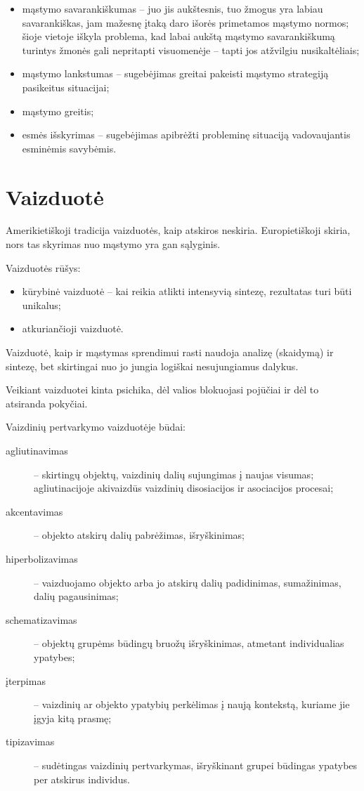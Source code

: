 \begin{itemize}
  \item mąstymo savarankiškumas – juo jis aukštesnis, tuo žmogus yra
    labiau savarankiškas, jam mažesnę įtaką daro išorės primetamos
    mąstymo normos; šioje vietoje iškyla problema, kad labai aukštą
    mąstymo savarankiškumą turintys žmonės gali nepritapti visuomenėje
    – tapti jos atžvilgiu nusikaltėliais;
  \item mąstymo lankstumas – sugebėjimas greitai pakeisti mąstymo
    strategiją pasikeitus situacijai;
  \item mąstymo greitis;
  \item esmės išskyrimas – sugebėjimas apibrėžti probleminę situaciją 
    vadovaujantis esminėmis savybėmis.
\end{itemize}

\section{Vaizduotė}

Amerikietiškoji tradicija vaizduotės, kaip atskiros neskiria. Europietiškoji
skiria, nors tas skyrimas nuo mąstymo yra gan sąlyginis.

Vaizduotės rūšys:

\begin{itemize}
  \item kūrybinė vaizduotė – kai reikia atlikti intensyvią sintezę, 
    rezultatas turi būti unikalus;
  \item atkuriančioji vaizduotė. %
\end{itemize}

Vaizduotė, kaip ir mąstymas sprendimui rasti naudoja analizę (skaidymą) ir
sintezę, bet skirtingai nuo jo jungia logiškai nesujungiamus dalykus.

Veikiant vaizduotei kinta psichika, dėl valios blokuojasi pojūčiai ir dėl
to atsiranda pokyčiai. %

Vaizdinių pertvarkymo vaizduotėje būdai:

\begin{description}
  \item[agliutinavimas] – skirtingų objektų, vaizdinių dalių sujungimas
    į naujas visumas; agliutinacijoje akivaizdūs vaizdinių disosiacijos
    ir asociacijos procesai;
  \item[akcentavimas] – objekto atskirų dalių pabrėžimas, išryškinimas;
  \item[hiperbolizavimas] – vaizduojamo objekto arba jo atskirų dalių
    padidinimas, sumažinimas, dalių pagausinimas;
  \item[schematizavimas] – objektų grupėms būdingų bruožų išryškinimas,
    atmetant individualias ypatybes;
  \item[įterpimas] – vaizdinių ar objekto ypatybių perkėlimas į naują 
    kontekstą, kuriame jie įgyja kitą prasmę;
  \item[tipizavimas] – sudėtingas vaizdinių pertvarkymas, išryškinant
    grupei būdingas ypatybes per atskirus individus.
\end{description}


